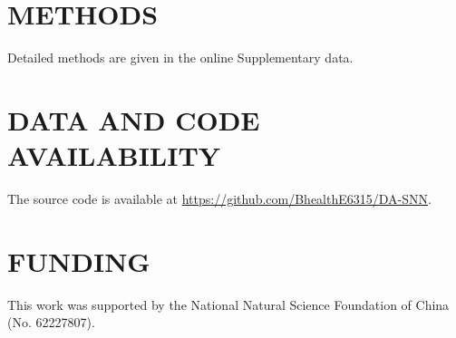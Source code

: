 \documentclass{nsr}
\begin{document}
\section{METHODS}
Detailed methods are given in the online Supplementary data.

\section{DATA AND CODE AVAILABILITY}
The source code is available at \url{https://github.com/BhealthE6315/DA-SNN}.

\section{FUNDING}
This work was supported by the National Natural Science Foundation of China (No. 62227807).



\end{document}
